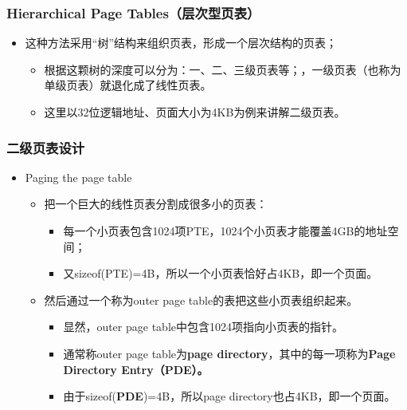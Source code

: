 \documentclass[CJKutf8,xcolor=pdftex,dvipsnames,table]{beamer}
\begin{document}
\begin{CJK*}{UTF8}{song}
  \begin{frame}
  \frametitle{Hierarchical Page Tables（层次型页表）} \pause
  \begin{itemize}
  \item{这种方法采用“树”结构来组织页表，形成一个层次结构的页表；} \pause
    \begin{itemize}
    \item{根据这颗树的深度可以分为：一、二、三级页表等；，一级页表（也称为单级页表）就退化成了线性页表。} \pause
    \item{这里以32位逻辑地址、页面大小为4KB为例来讲解二级页表。}
    \end{itemize}
  \end{itemize}
  \end{frame}
  
  \begin{frame}
  \frametitle{二级页表设计} \pause
  \begin{itemize}
  \item{Paging the page table} \pause
    \begin{itemize}
    \item{把一个巨大的线性页表分割成很多小的页表：} \pause
      \begin{itemize}
      \item{每一个小页表包含1024项PTE，1024个小页表才能覆盖4GB的地址空间；} \pause
      \item{又sizeof(PTE)=4B，所以一个小页表恰好占4KB，即一个页面。} \pause
      \end{itemize}
    \item{然后通过一个称为outer page table的表把这些小页表组织起来。} \pause
      \begin{itemize}
      \item{显然，outer page table中包含1024项指向小页表的指针。} \pause
      \item{通常称outer page table为\textbf{page directory}，其中的每一项称为\textbf{Page Directory Entry（PDE）。}} \pause
      \item{由于sizeof(\color{red}\textbf{PDE}\normalcolor)=4B，所以page directory也占4KB，即一个页面。}
      \end{itemize}
    \end{itemize}
  \end{itemize}
  \end{frame}
  

\end{CJK*}
\end{document}

